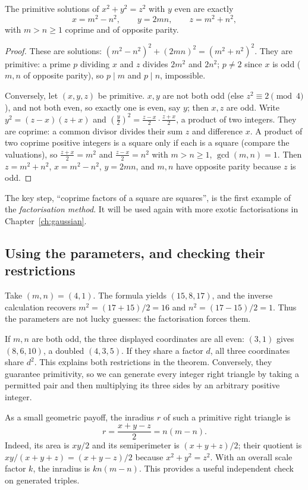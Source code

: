 \begin{theorem}\label{thm:pyth}
The primitive solutions of $x^2+y^2=z^2$ with $y$ even are exactly
\[
x=m^2-n^2,\qquad y=2mn,\qquad z=m^2+n^2,
\]
with $m>n\ge1$ coprime and of opposite parity.
\end{theorem}
\begin{proof}
These are solutions: $(m^2-n^2)^2+(2mn)^2=(m^2+n^2)^2$. They are primitive: a prime $p$ dividing $x$ and $z$ divides $2m^2$ and $2n^2$; $p\ne2$ since $x$ is odd ($m,n$ of opposite parity), so $p\mid m$ and $p\mid n$, impossible.

Conversely, let $(x,y,z)$ be primitive. $x,y$ are not both odd (else $z^2\equiv2\pmod4$), and not both even, so exactly one is even, say $y$; then $x,z$ are odd. Write $y^2=(z-x)(z+x)$ and $\left(\frac y2\right)^2=\frac{z-x}2\cdot\frac{z+x}2$, a product of two integers. They are coprime: a common divisor divides their sum $z$ and difference $x$. A product of two coprime positive integers is a square only if each is a square (compare the valuations), so $\frac{z+x}2=m^2$ and $\frac{z-x}2=n^2$ with $m>n\ge1$, $\gcd(m,n)=1$. Then $z=m^2+n^2$, $x=m^2-n^2$, $y=2mn$, and $m,n$ have opposite parity because $z$ is odd.
\end{proof}

The key step, ``coprime factors of a square are squares'', is the first example of the \emph{factorisation method}. It will be used again with more exotic factorisations in Chapter~\ref{ch:gaussian}.

\subsection*{Using the parameters, and checking their restrictions}
Take $(m,n)=(4,1)$. The formula yields $(15,8,17)$, and the inverse calculation recovers $m^2=(17+15)/2=16$ and $n^2=(17-15)/2=1$. Thus the parameters are not lucky guesses: the factorisation forces them.

If $m,n$ are both odd, the three displayed coordinates are all even: $(3,1)$ gives $(8,6,10)$, a doubled $(4,3,5)$. If they share a factor $d$, all three coordinates share $d^2$. This explains both restrictions in the theorem. Conversely, they guarantee primitivity, so we can generate every integer right triangle by taking a permitted pair and then multiplying its three sides by an arbitrary positive integer.

As a small geometric payoff, the inradius $r$ of such a primitive right triangle is
\[
r=\frac{x+y-z}{2}=n(m-n).
\]
Indeed, its area is $xy/2$ and its semiperimeter is $(x+y+z)/2$; their quotient is $xy/(x+y+z)=(x+y-z)/2$ because $x^2+y^2=z^2$. With an overall scale factor $k$, the inradius is $kn(m-n)$. This provides a useful independent check on generated triples.

